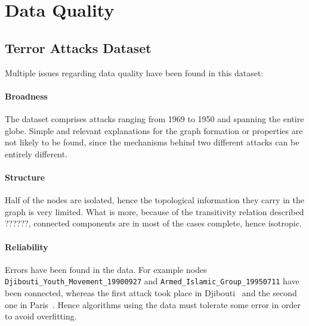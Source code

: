 \section{Data Quality}
\label{sec:DataQuality}

\subsection{Terror Attacks Dataset}
Multiple issues regarding data quality have been found in this dataset:

\paragraph{Broadness} 
The dataset comprises attacks ranging from 1969 to 1950 and spanning the entire globe. Simple and relevant explanations for the graph formation or properties are not likely to be found, since the mechanisms behind two different attacks can be entirely different.

\paragraph{Structure} 
Half of the nodes are isolated, hence the topological information they carry in the graph is very limited. What is more, because of the transitivity relation described ??????, connected components are in most of the cases complete, hence isotropic. 

\paragraph{Reliability} 
Errors have been found in the data. For example nodes
 \texttt{Djibouti\_Youth\_Movement\_19900927} 
 and 
 \texttt{Armed\_Islamic\_Group\_19950711} 
 have been connected, whereas the first attack took place in Djibouti~\cite{amnesty1991} and the second one in Paris~\cite{nouvelObs2007}. Hence algorithms using the data must tolerate some error in order to avoid overfitting.

